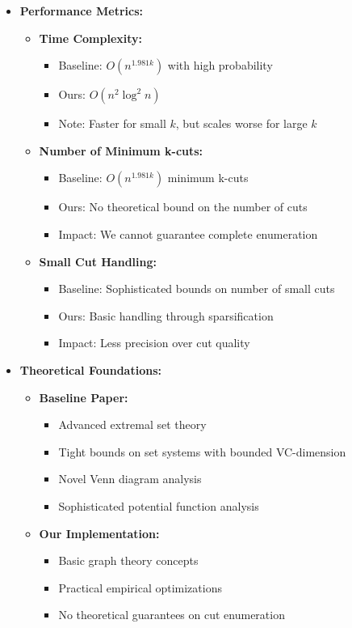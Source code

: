 \documentclass[11pt]{article}
\begin{document}
\begin{itemize}
    \item \textbf{Performance Metrics:}
    \begin{itemize}
        \item \textbf{Time Complexity:}
        \begin{itemize}
            \item Baseline: \( O(n^{1.981k}) \) with high probability
            \item Ours: \( O(n^2 \log^2 n) \)
            \item Note: Faster for small \( k \), but scales worse for large \( k \)
        \end{itemize}
        \item \textbf{Number of Minimum k-cuts:}
        \begin{itemize}
            \item Baseline: \( O(n^{1.981k}) \) minimum k-cuts
            \item Ours: No theoretical bound on the number of cuts
            \item Impact: We cannot guarantee complete enumeration
        \end{itemize}
        \item \textbf{Small Cut Handling:}
        \begin{itemize}
            \item Baseline: Sophisticated bounds on number of small cuts
            \item Ours: Basic handling through sparsification
            \item Impact: Less precision over cut quality
        \end{itemize}
    \end{itemize}

    \item \textbf{Theoretical Foundations:}
    \begin{itemize}
        \item \textbf{Baseline Paper:}
        \begin{itemize}
            \item Advanced extremal set theory
            \item Tight bounds on set systems with bounded VC-dimension
            \item Novel Venn diagram analysis
            \item Sophisticated potential function analysis
        \end{itemize}
        \item \textbf{Our Implementation:}
        \begin{itemize}
            \item Basic graph theory concepts
            \item Practical empirical optimizations
            \item No theoretical guarantees on cut enumeration
        \end{itemize}
    \end{itemize}


\end{itemize}
\end{document}
